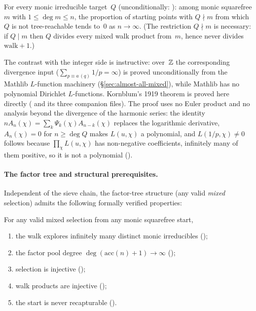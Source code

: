 \begin{theorem}
\label{thm:ff-density}
For every monic irreducible
target~$Q$ (unconditionally:
): among monic squarefree $m$ with $1 \leq \deg m \leq n$, the
proportion of starting points with $Q \nmid m$ from which $Q$ is not
tree-reachable tends to~$0$ as $n \to \infty$.  (The restriction
$Q \nmid m$ is necessary: if $Q \mid m$ then $Q$ divides every mixed
walk product from~$m$, hence never divides $\mathrm{walk}+1$.)
\end{theorem}

\noindent
The contrast with the integer side is instructive: over~$\mathbb{Z}$ the
corresponding divergence input ($\sum_{p \equiv a\,(q)} 1/p = \infty$)
is proved unconditionally from the Mathlib $L$-function machinery
(\S\ref{sec:almost-all-mixed}), while Mathlib has no polynomial
Dirichlet $L$-functions.  Kornblum's 1919 theorem is proved here
directly ( and its three companion files).  The proof uses no
Euler product and no analysis beyond the divergence of the harmonic
series: the identity $nA_n(\chi)=\sum_k\Psi_k(\chi)A_{n-k}(\chi)$ replaces
the logarithmic derivative, $A_n(\chi)=0$ for $n\ge\deg Q$ makes
$L(u,\chi)$ a polynomial, and $L(1/p,\chi)\ne0$ follows because
$\prod_\chi L(u,\chi)$ has non-negative coefficients, infinitely many of
them positive, so it is not a polynomial
().

\paragraph{The factor tree and structural prerequisites.}
Independent of the sieve chain, the factor-tree structure (any valid
\emph{mixed} selection) admits the following formally verified
properties:

\begin{theorem}
\label{thm:ff-A}
For any valid mixed selection from any monic squarefree start,
\begin{enumerate}[nosep,label=(\alph*)]
\item the walk explores infinitely many distinct monic irreducibles
  ();
\item the factor pool degree $\deg(\mathrm{acc}(n)+1) \to \infty$
  ();
\item selection is injective
  ();
\item walk products are injective
  ();
\item the start is never recapturable
  ().
\end{enumerate}
\end{theorem}

